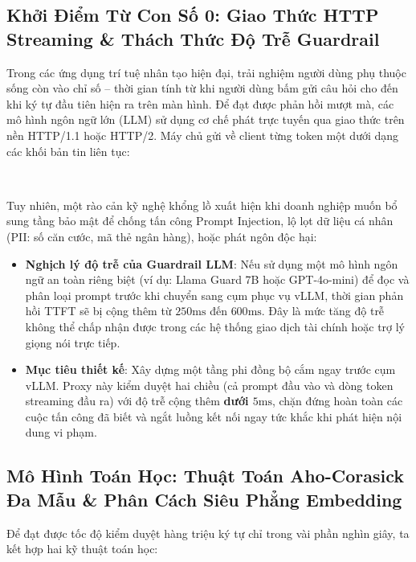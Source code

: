 \subsection{Khởi Điểm Từ Con Số 0: Giao Thức HTTP Streaming \& Thách Thức Độ Trễ Guardrail}
Trong các ứng dụng trí tuệ nhân tạo hiện đại, trải nghiệm người dùng phụ thuộc sống còn vào chỉ số  -- thời gian tính từ khi người dùng bấm gửi câu hỏi cho đến khi ký tự đầu tiên hiện ra trên màn hình. Để đạt được phản hồi mượt mà, các mô hình ngôn ngữ lớn (LLM) sử dụng cơ chế phát trực tuyến qua giao thức  trên nền HTTP/1.1 hoặc HTTP/2. Máy chủ gửi về client từng token một dưới dạng các khối bản tin liên tục:
\begin{center}
\\[2pt]
\end{center}

Tuy nhiên, một rào cản kỹ nghệ khổng lồ xuất hiện khi doanh nghiệp muốn bổ sung tầng bảo mật  để chống tấn công Prompt Injection, lộ lọt dữ liệu cá nhân (PII: số căn cước, mã thẻ ngân hàng), hoặc phát ngôn độc hại:
\begin{itemize}
  \item \textbf{Nghịch lý độ trễ của Guardrail LLM}: Nếu sử dụng một mô hình ngôn ngữ an toàn riêng biệt (ví dụ: Llama Guard 7B hoặc GPT-4o-mini) để đọc và phân loại prompt trước khi chuyển sang cụm phục vụ vLLM, thời gian phản hồi TTFT sẽ bị cộng thêm từ $250\text{ms}$ đến $600\text{ms}$. Đây là mức tăng độ trễ không thể chấp nhận được trong các hệ thống giao dịch tài chính hoặc trợ lý giọng nói trực tiếp.
  \item \textbf{Mục tiêu thiết kế}: Xây dựng một tầng  phi đồng bộ cắm ngay trước cụm vLLM. Proxy này kiểm duyệt hai chiều (cả prompt đầu vào và dòng token streaming đầu ra) với độ trễ cộng thêm \textbf{dưới $5\text{ms}$}, chặn đứng hoàn toàn các cuộc tấn công đã biết và ngắt luồng kết nối ngay tức khắc khi phát hiện nội dung vi phạm.
\end{itemize}

\subsection{Mô Hình Toán Học: Thuật Toán Aho-Corasick Đa Mẫu \& Phân Cách Siêu Phẳng Embedding}
Để đạt được tốc độ kiểm duyệt hàng triệu ký tự chỉ trong vài phần nghìn giây, ta kết hợp hai kỹ thuật toán học:

